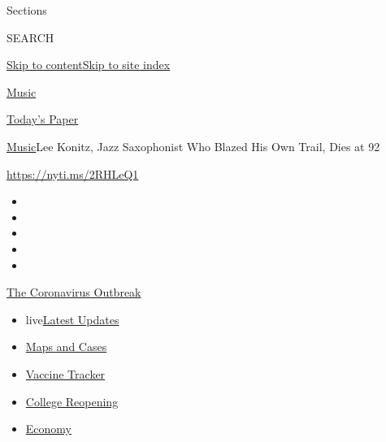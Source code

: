 Sections

SEARCH

\protect\hyperlink{site-content}{Skip to
content}\protect\hyperlink{site-index}{Skip to site index}

\href{https://www.nytimes.com/section/arts/music}{Music}

\href{https://myaccount.nytimes.com/auth/login?response_type=cookie\&client_id=vi}{}

\href{https://www.nytimes.com/section/todayspaper}{Today's Paper}

\href{/section/arts/music}{Music}\textbar{}Lee Konitz, Jazz Saxophonist
Who Blazed His Own Trail, Dies at 92

\url{https://nyti.ms/2RHLeQ1}

\begin{itemize}
\item
\item
\item
\item
\item
\end{itemize}

\href{https://www.nytimes.com/news-event/coronavirus?action=click\&pgtype=Article\&state=default\&region=TOP_BANNER\&context=storylines_menu}{The
Coronavirus Outbreak}

\begin{itemize}
\tightlist
\item
  live\href{https://www.nytimes.com/2020/08/03/world/coronavirus-covid-19.html?action=click\&pgtype=Article\&state=default\&region=TOP_BANNER\&context=storylines_menu}{Latest
  Updates}
\item
  \href{https://www.nytimes.com/interactive/2020/us/coronavirus-us-cases.html?action=click\&pgtype=Article\&state=default\&region=TOP_BANNER\&context=storylines_menu}{Maps
  and Cases}
\item
  \href{https://www.nytimes.com/interactive/2020/science/coronavirus-vaccine-tracker.html?action=click\&pgtype=Article\&state=default\&region=TOP_BANNER\&context=storylines_menu}{Vaccine
  Tracker}
\item
  \href{https://www.nytimes.com/2020/08/02/us/covid-college-reopening.html?action=click\&pgtype=Article\&state=default\&region=TOP_BANNER\&context=storylines_menu}{College
  Reopening}
\item
  \href{https://www.nytimes.com/live/2020/08/03/business/stock-market-today-coronavirus?action=click\&pgtype=Article\&state=default\&region=TOP_BANNER\&context=storylines_menu}{Economy}
\end{itemize}

